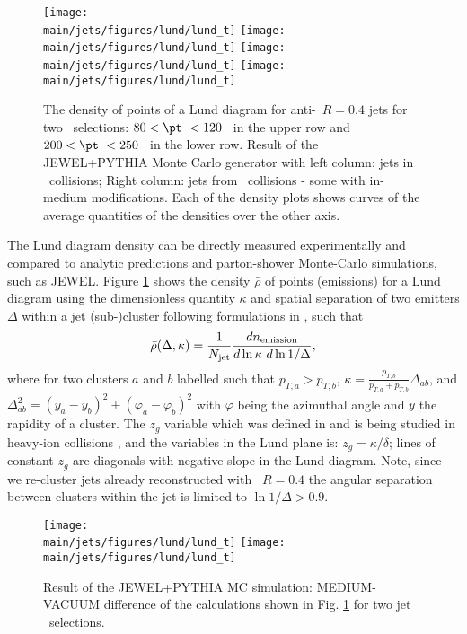 \begin{figure}[htbp]
	\centering
	\texttt{[image: \\main/jets/figures/lund/lund\_t]}
	\texttt{[image: \\main/jets/figures/lund/lund\_t]}
	\texttt{[image: \\main/jets/figures/lund/lund\_t]}
	\texttt{[image: \\main/jets/figures/lund/lund\_t]}
	\caption{The density of points of a Lund diagram for anti-\kT\ $R=0.4$ jets for two \pt\ selections: $80 < \pt\ < 120$ \gevc\ in the upper row and $200 < \pt\ < 250$ \gevc\ in the lower row. Result of the JEWEL+PYTHIA Monte Carlo generator with left column: jets in \pp\ collisions; Right column: jets from \PbPb\ collisions - some with in-medium modifications. Each of the density plots shows curves of the average quantities of the densities over the other axis.}
	\label{fig:Lund_jets}
\end{figure}

The Lund diagram density can be directly measured experimentally and compared to analytic predictions and parton-shower Monte-Carlo simulations, such as JEWEL.
Figure \ref{fig:Lund_jets} shows the density $\bar{\rho}$ of points (emissions) for a Lund diagram using the dimensionless quantity $\kappa$ and spatial separation of two emitters $\Delta$ within a jet (sub-)cluster following formulations in \cite{Dreyer:2018nbf}, such that
\begin{equation}
\bar{\rho}(\Delta, \kappa) = \frac{1}{N_{\rm jet}} \frac{dn_{\rm emission}}{d \ln \kappa~d \ln 1/\Delta},
\end{equation}
where for two clusters $a$ and $b$ labelled such that $p_{T,a} > p_{T,b}$, $\kappa=\frac{p_{T,b}}{p_{T,a} + p_{T,b}}\Delta_{ab}$, and $\Delta_{ab}^{2} = (y_a - y_b)^2 + (\varphi_a - \varphi_b)^2$ with $\varphi$ being the azimuthal angle and $y$ the rapidity of a cluster.
The $z_{g}$ variable which was defined in \cite{Larkoski:2017bvj} and is being studied in heavy-ion collisions \cite{Sirunyan:2017bsd}, and the variables in the Lund plane is: $z_{g} = \kappa/\delta$; lines of constant $z_g$ are diagonals with negative slope in the Lund diagram.
Note, since we re-cluster jets already reconstructed with \akt\ $R=0.4$ the angular separation between clusters within the jet is limited to $\ln 1/\Delta > 0.9$.

\begin{figure}[htbp]
	\centering
	\texttt{[image: \\main/jets/figures/lund/lund\_t]}
	\texttt{[image: \\main/jets/figures/lund/lund\_t]}
	\caption{Result of the JEWEL+PYTHIA MC simulation: MEDIUM-VACUUM difference of the calculations shown in Fig. \ref{fig:Lund_jets} for two jet \pt\ selections.}
	\label{fig:Lund_jets_vac_med}
\end{figure}

